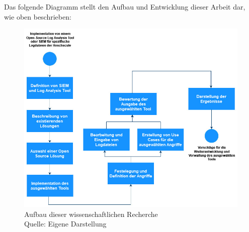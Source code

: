 

\newpage
Das folgende Diagramm stellt den Aufbau und Entwicklung dieser Arbeit dar, wie oben beschrieben:

\begin{figure}[H]
   \centering
   \includegraphics[width=1\textwidth]{assets/1_p1.jpg}
   \caption[Aufbau dieser wissenschaftlichen Recherche]
   {Aufbau dieser wissenschaftlichen Recherche \\Quelle: Eigene Darstellung }
   \centering
\end{figure}



